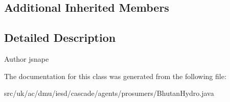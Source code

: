 \subsection*{Additional Inherited Members}


\subsection{Detailed Description}
\begin{DoxyAuthor}{Author}
jsnape 
\end{DoxyAuthor}


The documentation for this class was generated from the following file\-:\begin{DoxyCompactItemize}
\item 
src/uk/ac/dmu/iesd/cascade/agents/prosumers/Bhutan\-Hydro.\-java\end{DoxyCompactItemize}
